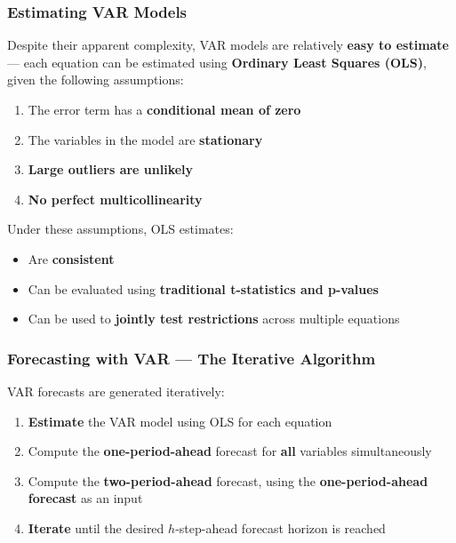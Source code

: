 \documentclass[12pt,openany]{book}
\begin{document}
\subsubsection{Estimating VAR Models}

Despite their apparent complexity, VAR models are relatively \textbf{easy to estimate} --- each equation can be estimated using \textbf{Ordinary Least Squares (OLS)}, given the following assumptions:

\begin{enumerate}[leftmargin=*]
    \item The error term has a \textbf{conditional mean of zero}
    \item The variables in the model are \textbf{stationary}
    \item \textbf{Large outliers are unlikely}
    \item \textbf{No perfect multicollinearity}
\end{enumerate}

Under these assumptions, OLS estimates:
\begin{itemize}[leftmargin=*]
    \item Are \textbf{consistent}
    \item Can be evaluated using \textbf{traditional t-statistics and p-values}
    \item Can be used to \textbf{jointly test restrictions} across multiple equations
\end{itemize}

\subsubsection{Forecasting with VAR --- The Iterative Algorithm}

VAR forecasts are generated iteratively:

\begin{enumerate}[leftmargin=*]
    \item \textbf{Estimate} the VAR model using OLS for each equation
    \item Compute the \textbf{one-period-ahead} forecast for \textbf{all} variables simultaneously
    \item Compute the \textbf{two-period-ahead} forecast, using the \textbf{one-period-ahead forecast} as an input
    \item \textbf{Iterate} until the desired \(h\)-step-ahead forecast horizon is reached
\end{enumerate}
\end{document}
